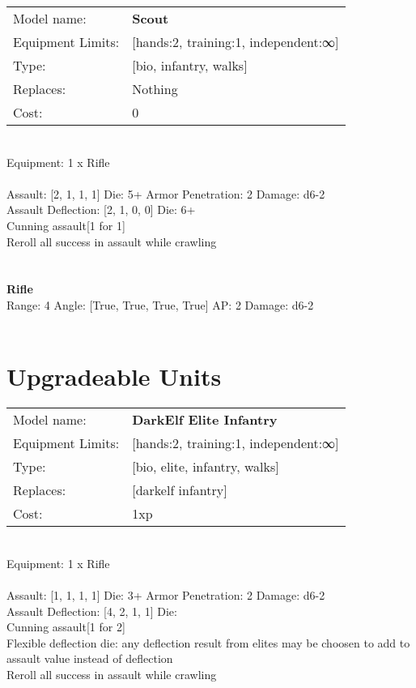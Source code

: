 \noindent
\begin{tabular}{ll}
Model name: &{\bf Scout } \\
Equipment Limits: &[hands:2, training:1, independent:∞] \\
Type: &[bio, infantry, walks] \\
Replaces: &Nothing \\
Cost: & 0\\
\end{tabular}
\ \\
Equipment: 1 x Rifle \\
\ \\
Assault: [2, 1, 1, 1] Die: 5+ Armor Penetration: 2 Damage: d6-2 \\
Assault Deflection: [2, 1, 0, 0] Die: 6+\\
\indent Cunning assault[1 for 1]\\ 
Reroll all success in assault while crawling\\ 
 
\ \\

\ \\
{\bf Rifle } \\



Range: 4  Angle: [True, True, True, True] AP: 2 Damage: d6-2 \\




 
\ \\













\section{Upgradeable Units}\noindent
\begin{tabular}{ll}
Model name: &{\bf DarkElf Elite Infantry } \\
Equipment Limits: &[hands:2, training:1, independent:∞] \\
Type: &[bio, elite, infantry, walks] \\
Replaces: &[darkelf infantry] \\
Cost: & 1xp\\
\end{tabular}
\ \\
Equipment: 1 x Rifle \\
\ \\
Assault: [1, 1, 1, 1] Die: 3+ Armor Penetration: 2 Damage: d6-2 \\
Assault Deflection: [4, 2, 1, 1] Die: \\
\indent Cunning assault[1 for 2]\\ 
Flexible deflection die: any deflection result from elites may be choosen to add to assault value instead of deflection\\ 
Reroll all success in assault while crawling\\ 
 
